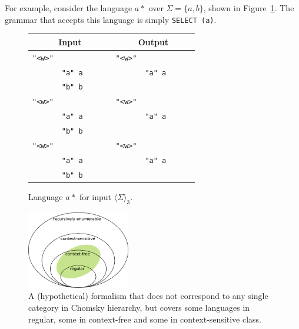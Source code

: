 \documentclass[11pt]{article}
\def\t#1{\texttt{#1}}
\def\maxAmb#1{$\langle \Sigma \rangle_#1$}
\begin{document}
For example, consider the language $a*$ over $\Sigma = \{a,b\}$,
shown in Figure~\ref{fig:astar}.
The grammar that accepts this language is simply \texttt{SELECT (a)}.

\def\wwf{\t{"<w>"}}
\def\swf{\t{"<s>"}}
\def\alm{\t{"a" a}~~~~~~}
\def\blm{\t{"b" b}~~~~~~}

\begin{figure}[h]
\centering

\begin{tabular}{cl |  rl}
\multicolumn{2}{c|}{\textbf{Input}} & \multicolumn{2}{c}{\textbf{Output}} \\ \hline

\wwf  &        &  \wwf &        \\
         & \alm  &          & \alm  \\
         & \blm  &          &        \\
\wwf  &        &  \wwf &        \\
         & \alm  &          & \alm  \\
         & \blm  &          &        \\
\wwf  &        &  \wwf &        \\
         & \alm  &          & \alm  \\
         & \blm  &          &        \\
\end{tabular}

\caption{Language $a*$ for input \maxAmb{3}.}
\label{fig:astar}
\end{figure}



\begin{figure}[t]
  \centering
    \includegraphics[width=0.4\textwidth]{chomsky.png}
  \caption{A (hypothetical) formalism that does not correspond to any single category in Chomsky hierarchy, but covers some languages in regular, some in context-free and some in context-sensitive class.}
 \label{fig:nocorr}
\end{figure}
\end{document}
